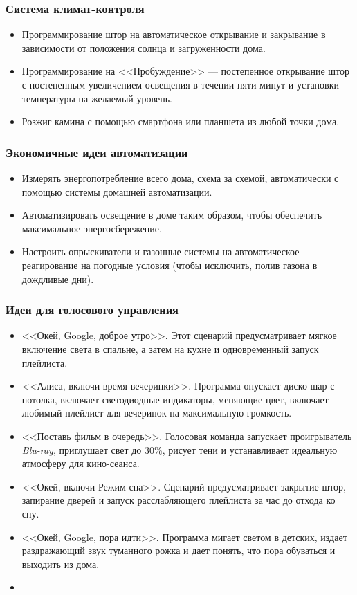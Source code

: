 \documentclass[a4paper,14pt]{extarticle}
\begin{document}
\subsubsection*{Система климат-контроля}
\begin{itemize}
	\item Программирование штор на автоматическое открывание и закрывание в зависимости от положения солнца и загруженности дома.
	\item Программирование на <<Пробуждение>> --- постепенное открывание штор с постепенным увеличением освещения в течении пяти минут и установки температуры на желаемый уровень.
	\item Розжиг камина с помощью смартфона или планшета из любой точки дома.
\end{itemize}

\subsubsection*{Экономичные идеи автоматизации}
\begin{itemize}
	\item Измерять энергопотребление всего дома, схема за схемой, автоматически с помощью системы домашней автоматизации.
	\item Автоматизировать освещение в доме таким образом, чтобы обеспечить максимальное энергосбережение.
	\item Настроить опрыскиватели и газонные системы на автоматическое реагирование на погодные условия (чтобы исключить, полив газона в дождливые дни).
\end{itemize}
\subsubsection*{Идеи для голосового управления}
\begin{itemize}
\item  <<Окей, Google, доброе утро>>. Этот сценарий предусматривает мягкое включение света в спальне, а затем на кухне и одновременный запуск плейлиста.
\item <<Алиса, включи время вечеринки>>. Программа опускает диско-шар с потолка, включает светодиодные индикаторы, меняющие цвет, включает любимый плейлист для вечеринок на максимальную громкость.
\item <<Поставь фильм в очередь>>. Голосовая команда запускает проигрыватель \textit{Blu-ray}, приглушает свет до 30\%, рисует тени и устанавливает идеальную атмосферу для кино-сеанса.
\item  <<Окей, включи Режим сна>>. Сценарий предусматривает закрытие штор, запирание дверей и запуск расслабляющего плейлиста за час до отхода ко сну.
\item  <<Окей, Google, пора идти>>. Программа мигает светом в детских, издает раздражающий звук туманного рожка и дает понять, что пора обуваться и выходить из дома.
\item 
\end{itemize}
\end{document}
